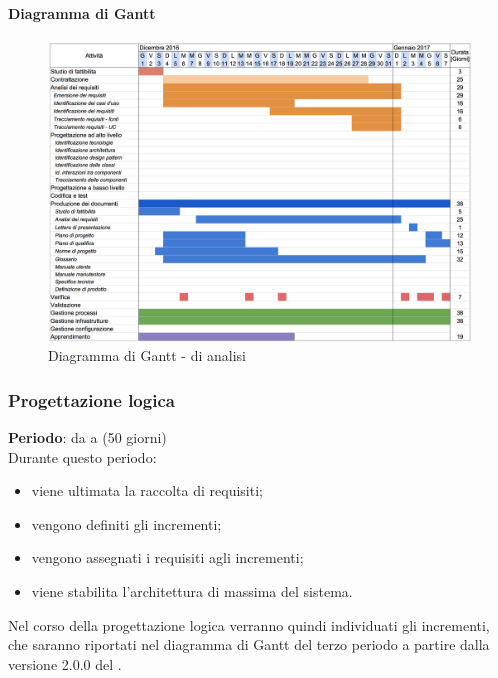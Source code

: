 		\paragraph{Diagramma di Gantt}
		\begin{figure}[H]
			\centering
			\includegraphics[width=\textwidth]{img/Gantt/g1c.png}
			\caption{Diagramma di Gantt -  di analisi}
		\end{figure}
		
	\newpage
	\subsubsection {Progettazione logica}
		\textbf{Periodo}: da  a  (50 giorni) \\
		Durante questo periodo:
		\begin{itemize}
			\item viene ultimata la raccolta di requisiti;
			\item vengono definiti gli incrementi;
			\item vengono assegnati i requisiti agli incrementi;
			\item viene stabilita l'architettura di massima del sistema.
		\end{itemize}
		Nel corso della progettazione logica verranno quindi individuati gli incrementi, che saranno riportati nel diagramma di Gantt del terzo periodo a partire dalla versione 2.0.0 del \pdp.

